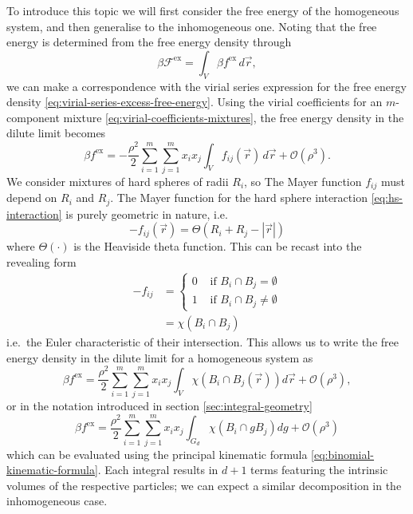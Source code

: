 To introduce this topic we will first consider the free energy of the homogeneous system, and then generalise to the inhomogeneous one.
Noting that the free energy is determined from the free energy density through
\begin{equation*}
  \beta \mathcal{F}^\mathrm{ex} = \int_V \beta f^\mathrm{ex} \, d\vec{r},
\end{equation*}
we can make a correspondence with the virial series expression for the free energy density \eqref{eq:virial-series-excess-free-energy}.
Using the virial coefficients for an $m$-component mixture \eqref{eq:virial-coefficients-mixtures}, the free energy density in the dilute limit becomes%
\begin{equation*}
  \beta f^\mathrm{ex}
  =
  - \frac{\rho^2}{2}
  \sum_{i = 1}^m \sum_{j = 1}^m x_i x_j \int_V
  f_{ij}(\vec{r})
  \, d\vec{r}
  + \mathcal{O}(\rho^3).
\end{equation*}
We consider mixtures of hard spheres of radii $R_i$, so The Mayer function $f_{ij}$ must depend on $R_i$ and $R_j$.
The Mayer function for the hard sphere interaction \eqref{eq:hs-interaction} is purely geometric in nature, i.e.\
\begin{equation*}
  -f_{ij}(\vec{r})
  =
  \Theta(R_i + R_j - |\vec{r}|)
\end{equation*}
where $\Theta(\cdot)$ is the Heaviside theta function.
This can be recast into the revealing form
\begin{equation*}\label{eq:hard-mayer-f}
  \begin{split}
    -f_{ij}
    &=
    \begin{cases}
      0 & \textrm{ if } B_i \cap B_j = \emptyset \\
      1 & \textrm{ if } B_i \cap B_j \ne \emptyset
    \end{cases}
    \\ &=
    \chi(B_i \cap B_j)
  \end{split}
\end{equation*}
i.e.\ the Euler characteristic of their intersection.
This allows us to write the free energy density in the dilute limit for a homogeneous system as
\begin{equation*}
  \beta f^\mathrm{ex}
  =
  \frac{\rho^2}{2}
  \sum_{i=1}^m \sum_{j=1}^m
  x_i x_j
  \int_V \chi(B_i \cap B_j(\vec{r})) d\vec{r}
  + \mathcal{O}(\rho^3),
\end{equation*}
or in the notation introduced in section \ref{sec:integral-geometry}
\begin{equation*}
  \beta f^\mathrm{ex}
  =
  \frac{\rho^2}{2}
  \sum_{i=1}^m \sum_{j=1}^m
  x_i x_j
  \int_{G_d} \chi(B_i \cap g B_j) dg
  + \mathcal{O}(\rho^3)
\end{equation*}
which can be evaluated using the principal kinematic formula \eqref{eq:binomial-kinematic-formula}.
Each integral results in $d+1$ terms featuring the intrinsic volumes of the respective particles; we can expect a similar decomposition in the inhomogeneous case.

